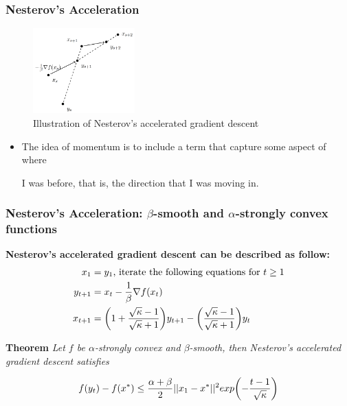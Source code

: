 \begin{frame}\frametitle{ Nesterov’s Acceleration}

    \begin{figure}[h]
    \centering
    \includegraphics[width=0.35\textwidth]{./figures/fig_agd.png}
    
    \caption{Illustration of Nesterov’s accelerated gradient descent}
    \label{fig:figures}
    \end{figure}
    \begin{itemize}
        \item The idea of momentum is to include a term that capture some aspect of where 
        
        I was before, that is, the direction that I was moving in.
    \end{itemize}
\end{frame}

\begin{frame}\frametitle{ Nesterov’s Acceleration: $\beta$-smooth and $\alpha$-strongly convex functions}
\begin{spacing}{0.8}
\textbf{Nesterov's accelerated gradient descent can be described as follow:}
\begin{align*}
    x_1 &= y_1 \text{, iterate the following equations for }t\geq 1\\
    y_{t+1} &= x_t - {1 \over \beta} \nabla{f(x_t)} \\
    x_{t+1} &= {\left(1+{\sqrt{\kappa}-1 \over \sqrt{\kappa}+1}\right)}y_{t+1}-{\left({\sqrt{\kappa}-1 \over \sqrt{\kappa}+1}\right)}y_{t} \\
\end{align*}
\end{spacing}
\textbf{Theorem} {\it Let $f$ be $\alpha$-strongly convex and $\beta$-smooth, then Nesterov's accelerated gradient descent satisfies}

$$f(y_t)-f(x^*) \leq {\alpha+\beta \over 2}||x_1-x^*||^2 exp{\left(-{{t-1} \over \sqrt{\kappa}}\right)}$$
\end{frame}

